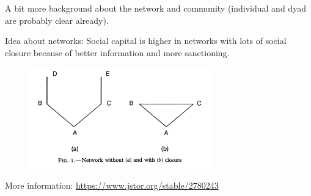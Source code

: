 \documentclass[aspectratio=169]{beamer}
\begin{document}
\begin{frame}

A bit more background about the network and community (individual and dyad are probably clear already).

\end{frame}
\begin{frame}

Idea about networks: Social capital is higher in networks with lots of social closure because of better information and more sanctioning.  

\begin{figure}
\includegraphics[width=0.7\textwidth]{figures/coleman_social_1988_fig1}
\end{figure}

More information: \url{https://www.jstor.org/stable/2780243}
\end{frame}
\end{document}

